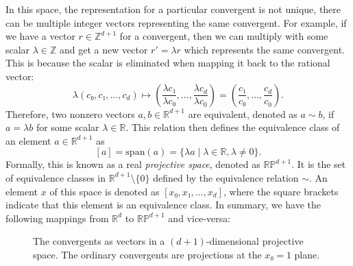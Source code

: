 In this space, the representation for a particular convergent is not unique,
there can be multiple integer vectors representing the same convergent.
For example, if we have a vector $r ∈ ℤ^{d+1}$ for a convergent,
then we can multiply with some scalar $λ ∈ ℤ$ and get a new vector $r' = λ r$
which represents the same convergent.
This is because the scalar is eliminated when mapping it back to the rational vector:
\[
  λ (c₀, c₁, …, c_d)
  ↦ \left(\frac{λ c₁}{λ c₀}, …, \frac{λ c_d}{λ c_0} \right)
  = \left(\frac{c₁}{c₀}, …, \frac{c_d}{c_0} \right).
\]
Therefore, two nonzero vectors $a, b ∈ ℝ^{d+1}$ are equivalent,
denoted as $a \sim b$, if $a = λ b$ for some scalar $λ ∈ ℝ$.
This relation then defines the equivalence class of an element $a ∈ ℝ^{d+1}$ as
\[
  [a] = \mathrm{span}(a) = \{ λ a \mid λ ∈ ℝ, λ ≠ 0 \}.
\]
Formally, this is known as a real \emph{projective space}, denoted as $\mathbb{RP}^{d+1}$.
It is the set of equivalence classes in $ℝ^{d+1} \setminus \{0\}$ defined by the
equivalence relation $\sim$.
An element $x$ of this space is denoted as $[x₀, x₁, …, x_d]$,
where the square brackets indicate that this element is an equivalence
class.
In summary, we have the following mappings from $ℝ^d$ to $\mathbb{RP}^{d+1}$
and vice-versa:

\begin{center}
\end{center}

\begin{figure}[tbp]
  \centering
  
  \caption{
    The convergents as vectors in a $(d+1)$-dimensional projective space.
    The ordinary convergents are projections at the $x₀ = 1$ plane.
  }
  \label{fig:projective-space}
\end{figure}

